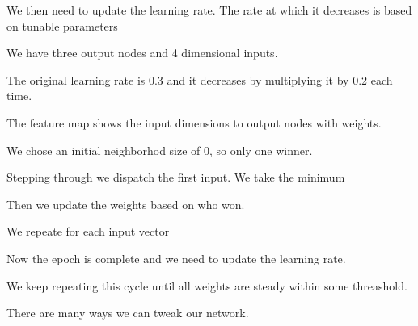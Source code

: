 \documentclass{article}
\begin{document}
We then need to update the learning rate. The rate at which it decreases is based on tunable parameters


We have three output nodes and 4 dimensional inputs.

The original learning rate is 0.3 and it decreases by multiplying it by 0.2 each time.

The feature map shows the input dimensions to output nodes with weights.

We chose an initial neighborhod size of 0, so only one winner.

Stepping through we dispatch the first input. We take the minimum

Then we update the weights based on who won.

We repeate for each input vector

Now the epoch is complete and we need to update the learning rate.

We keep repeating this cycle until all weights are steady within some threashold.



There are many ways we can tweak our network.


\end{document}
